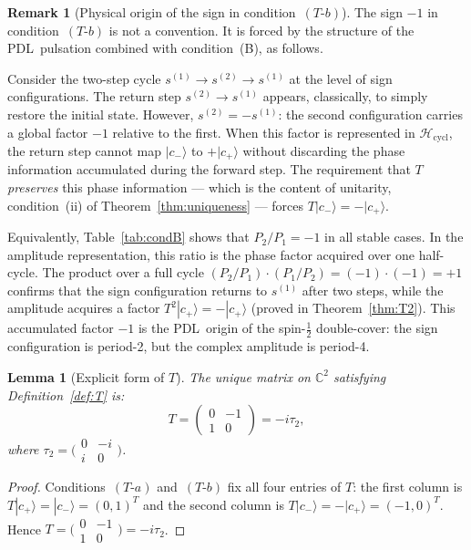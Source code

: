 \documentclass[11pt,a4paper]{article}
\newtheorem{lemma}[theorem]{Lemma}
\theoremstyle{definition}
\newtheorem{remark}[theorem]{Remark}
\newcommand{\PDL}{\textnormal{PDL}}
\newcommand{\Hcycl}{\mathcal{H}_{\mathrm{cycl}}}
\newcommand{\cplu}{|c_+\rangle}
\newcommand{\cmin}{|c_-\rangle}
\begin{document}
\begin{remark}[Physical origin of the sign in condition~$(T\textrm{-}b)$]
\label{rem:sign_origin}
The sign $-1$ in condition~$(T\textrm{-}b)$ is not a convention. It is forced by the structure of the \PDL\ pulsation combined with condition~(B), as follows.

Consider the two-step cycle $s^{(1)} \to s^{(2)} \to s^{(1)}$ at the level of sign configurations. The return step $s^{(2)} \to s^{(1)}$ appears, classically, to simply restore the initial state. However, $s^{(2)} = -s^{(1)}$: the second configuration carries a global factor $-1$ relative to the first. When this factor is represented in $\Hcycl$, the return step cannot map $\cmin$ to $+\cplu$ without discarding the phase information accumulated during the forward step. The requirement that $T$ \emph{preserves} this phase information --- which is the content of unitarity, condition~(ii) of Theorem~\ref{thm:uniqueness} --- forces $T\cmin = -\cplu$.

Equivalently, Table~\ref{tab:condB} shows that $P_2/P_1 = -1$ in all stable cases. In the amplitude representation, this ratio is the phase factor acquired over one half-cycle. The product over a full cycle $(P_2/P_1)\cdot(P_1/P_2) = (-1)\cdot(-1) = +1$ confirms that the sign configuration returns to $s^{(1)}$ after two steps, while the amplitude acquires a factor $T^2\cplu = -\cplu$ (proved in Theorem~\ref{thm:T2}). This accumulated factor $-1$ is the \PDL\ origin of the spin-$\tfrac{1}{2}$ double-cover: the sign configuration is period-2, but the complex amplitude is period-4.
\end{remark}

\begin{lemma}[Explicit form of $T$]
\label{lem:T_explicit}
The unique matrix on $\mathbb{C}^2$ satisfying Definition~\ref{def:T} is:
\begin{equation}
T = \begin{pmatrix} 0 & -1 \\ 1 & 0 \end{pmatrix} = -i\tau_2,
\label{eq:T_matrix}
\end{equation}
where $\tau_2 = \bigl(\begin{smallmatrix}0 & -i \\ i & 0\end{smallmatrix}\bigr)$.
\end{lemma}

\begin{proof}
Conditions~$(T\textrm{-}a)$ and~$(T\textrm{-}b)$ fix all four entries of $T$: the first column is $T\cplu = \cmin = (0,1)^T$ and the second column is $T\cmin = -\cplu = (-1,0)^T$. Hence $T = \bigl(\begin{smallmatrix}0&-1\\1&0\end{smallmatrix}\bigr) = -i\tau_2$.
\end{proof}
\end{document}
